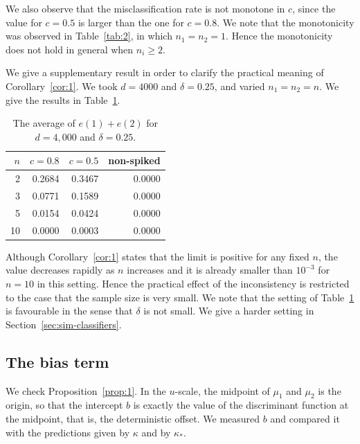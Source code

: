We also observe that the misclassification rate is not monotone in $c$, since the
value for $c=0.5$ is larger than the one for $c=0.8$. We note that the
monotonicity was observed in Table~\ref{tab:2}, in which $n_1=n_2=1$. Hence the
monotonicity does not hold in general when $n_i\ge 2$.

We give a supplementary result in order to clarify the practical meaning of
Corollary~\ref{cor:1}. We took $d=4000$ and $\delta=0.25$, and varied
$n_1=n_2=n$. We give the results in Table~\ref{tab:n-vary}.

\begin{table}[ht]
\centering
\caption{The average of $e(1)+e(2)$ for $d=4{,}000$ and $\delta=0.25$.}
\label{tab:n-vary}
\begin{tabular}{@{}rrrr@{}}
\toprule
$n$ & $c=0.8$ & $c=0.5$ & non-spiked \\
\midrule
2 & 0.2684 & 0.3467 & 0.0000 \\
3 & 0.0771 & 0.1589 & 0.0000 \\
5 & 0.0154 & 0.0424 & 0.0000 \\
10 & 0.0000 & 0.0003 & 0.0000 \\
\bottomrule
\end{tabular}
\end{table}

Although Corollary~\ref{cor:1} states that the limit is positive for any fixed $n$,
the value decreases rapidly as $n$ increases and it is already smaller than
$10^{-3}$ for $n=10$ in this setting. Hence the practical effect of the
inconsistency is restricted to the case that the sample size is very small. We
note that the setting of Table~\ref{tab:n-vary} is favourable in the sense that
$\delta$ is not small. We give a harder setting in
Section~\ref{sec:sim-classifiers}.

\subsection{The bias term}
\label{sec:sim-bias}

We check Proposition~\ref{prop:1}. In the $u$-scale, the midpoint of $\mu_1$ and
$\mu_2$ is the origin, so that the intercept $b$ is exactly the value of the
discriminant function at the midpoint, that is, the deterministic offset. We
measured $b$ and compared it with the predictions given by $\kappa$ and by
$\kappa_*$.

